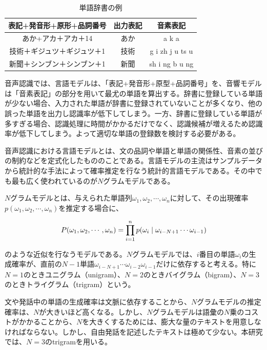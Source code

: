 \begin{table}[H]
  \begin{center}
    \caption{単語辞書の例}
    \begin{tabular}{|c||c|c|} \hline
      表記+発音形+原形+品詞番号 & 出力表記 & 音素表記 \\ \hline
      あか+アカ＋アカ＋14 & あか & a k a \\ \hline
      技術＋ギジュツ＋ギジュツ＋1 & 技術 & g i zh j u ts u \\ \hline
      新聞＋シンブン＋シンブン＋1 & 新聞 & sh i ng b u ng \\ \hline
    \end{tabular}
    \label{table:tango}
  \end{center}
\end{table}

音声認識では、言語モデルは、「表記+発音形+原型+品詞番号」を、音響モデルは「音素表記」の部分を用いて最尤の単語を算出する。辞書に登録している単語が少ない場合、入力された単語が辞書に登録されていないことが多くなり、他の誤った単語を出力し認識率が低下してしまう。一方、辞書に登録している単語が多すぎる場合、認識処理に時間がかかるだけでなく、認識候補が増えるため認識率が低下してしまう。よって適切な単語の登録数を検討する必要がある。\vspace{0.2in}

\par
音声認識における言語モデルとは、文の品詞や単語と単語の関係性、音素の並びの制約などを定式化したもののことである。言語モデルの主流はサンプルデータから統計的な手法によって確率推定を行なう統計的言語モデルである。その中でも最も広く使われているのが$N$グラムモデルである。\vspace{0.2in}

\par
$N$グラムモデルとは、与えられた単語列$\omega_1,\omega_2,\cdots,\omega_n$に対して、その出現確率$p(\omega_1,\omega_2,\cdots,\omega_n)$を推定する場合に、

\begin{equation}
P(\omega_1,\omega_2,\cdots,\omega_n)=\prod_{i=1}^{n}p(\omega_{i}\mid \omega_{i-N+1}\cdots \omega_{i-1}) \notag
\end{equation}

のような近似を行なうモデルである。$N$グラムモデルでは、$i$番目の単語$ω_i$の生成確率が、直前の$N-1$単語$ω_{i-N+1}\cdots ω_{i-2}ω_{i-1}$だけに依存すると考える。特に$N = 1$のときユニグラム（unigram）、$N = 2$のときバイグラム（bigram）、$N = 3$のときトライグラム（trigram）という。\par
文や発話中の単語の生成確率は文脈に依存することから、$N$グラムモデルの推定確率は、$N$が大きいほど高くなる。しかし、$N$グラムモデルは語彙の$N$乗のコストがかかることから、$N$を大きくするためには、膨大な量のテキストを用意しなければならない。しかし、自由発話を記述したテキストは極めて少ない。本研究では、$N = 3$のtrigramを用いる。\par



